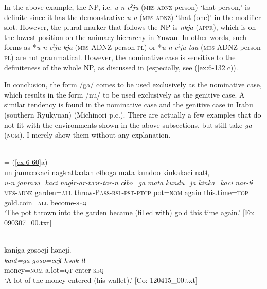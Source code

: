 In the above example, the NP, i.e. \textit{u-n} \textit{cˀju} (\textsc{mes}-\textsc{adnz} person) ‘that person,’ is definite since it has the demonstrative \textit{u-n} (\textsc{mes}-\textsc{adnz}) ‘that (one)’ in the modifier slot. However, the plural marker that follows the NP is \textit{nkja} (\textsc{appr}), which is on the lowest position on the animacy hierarchy in Yuwan. In other words, such forms as *\textit{u-n} \textit{cˀju-kja} (\textsc{mes}-ADNZ person-\textsc{pl}) or *\textit{u-n} \textit{cˀju-taa} (\textsc{mes}-ADNZ person-\textsc{pl}) are not grammatical. However, the nominative case is sensitive to the definiteness of the whole NP, as discussed in  (especially, see (\ref{ex:6-132}c)).

  In conclusion, the form /ga/ comes to be used exclusively as the nominative case, which results in the form /nu/ to be used exclusively as the genitive case. A similar tendency is found in the nominative case and the genitive case in Irabu (southern Ryukyuan) (Michinori \citealt{Shimoji2013} p.c.). There are actually a few examples that do not fit with the environments shown in the above subsections, but still take \textit{ga} (\textsc{nom}). I merely show them without any explanation.

\ea\label{ex:6-138}
\ea{}\\
= (\ref{ex:6-60}a)\\

{\TM}
\glll un  janməəkaci  nagɨrattəətan  cɨboga   mata  kundoo  kinkakaci  natɨ,\\
      \textit{u-n}  \textit{janməə=kaci}  \textit{nagɨr-ar-təər-tar-n}  \textit{cɨbo=ga}      \textit{mata}  \textit{kundu=ja}  \textit{kinka=kaci}  \textit{nar-tɨ}\\
      \textsc{mes}-\textsc{adnz}  garden=\textsc{all}  throw-P\textsc{ass}-\textsc{rsl}-\textsc{pst}-\textsc{ptcp}  pot=\textsc{nom}      again  this.time=\textsc{top}  gold.coin=\textsc{all}  become-\textsc{seq}\\
\glt ‘The pot thrown into the garden became (filled with) gold this time again.’ [Fo: 090307\_00.txt]

\ex{}\\
{\TM}
\glll  kanɨga  {\textbar}goso{\textbar}cjɨ  həncjɨ.\\
\textit{kanɨ=ga}  \textit{goso=ccjɨ}  \textit{hənk-tɨ}\\
money=\textsc{nom}  a.lot=\textsc{qt}  enter-\textsc{seq}\\
\glt ‘A lot of the money entered (his wallet).’ [Co: 120415\_00.txt]

